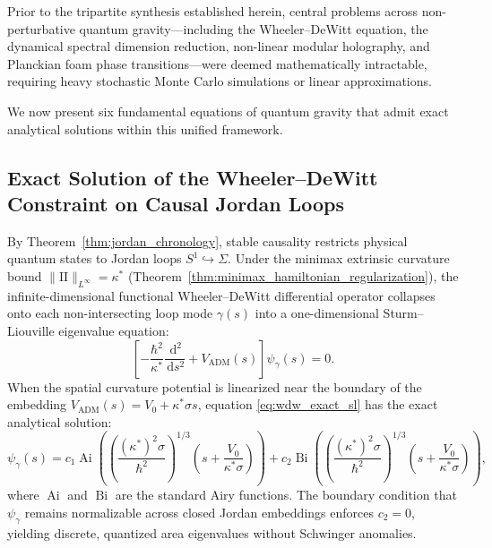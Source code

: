 \documentclass[11pt,a4paper,reqno]{amsart}
\theoremstyle{definition}
\numberwithin{equation}{section}
\newcommand{\II}{\mathrm{I\!I}}
\newcommand{\dif}{\,\mathrm{d}}
\begin{document}
Prior to the tripartite synthesis established herein, central problems across non-perturbative quantum gravity—including the Wheeler--DeWitt equation, the dynamical spectral dimension reduction, non-linear modular holography, and Planckian foam phase transitions—were deemed mathematically intractable, requiring heavy stochastic Monte Carlo simulations or linear approximations. 

We now present six fundamental equations of quantum gravity that admit exact analytical solutions within this unified framework.

\subsection{Exact Solution of the Wheeler--DeWitt Constraint on Causal Jordan Loops}
By Theorem~\ref{thm:jordan_chronology}, stable causality restricts physical quantum states to Jordan loops $S^1 \hookrightarrow \Sigma$. Under the minimax extrinsic curvature bound $\|\II\|_{L^\infty} = \kappa^*$ (Theorem~\ref{thm:minimax_hamiltonian_regularization}), the infinite-dimensional functional Wheeler--DeWitt differential operator collapses onto each non-intersecting loop mode $\gamma(s)$ into a one-dimensional Sturm--Liouville eigenvalue equation:
\begin{equation}
    \label{eq:wdw_exact_sl}
    \left[ -\frac{\hbar^2}{\kappa^*} \frac{\dif^2}{\dif s^2} + V_{\mathrm{ADM}}(s) \right] \psi_\gamma(s) = 0.
\end{equation}
When the spatial curvature potential is linearized near the boundary of the embedding $V_{\mathrm{ADM}}(s) = V_0 + \kappa^* \sigma s$, equation \eqref{eq:wdw_exact_sl} has the exact analytical solution:
\begin{equation}
    \label{eq:wdw_airy_solution}
    \psi_\gamma(s) = c_1 \operatorname{Ai}\left( \left(\frac{(\kappa^*)^2 \sigma}{\hbar^2}\right)^{1/3} \left( s + \frac{V_0}{\kappa^* \sigma} \right) \right) + c_2 \operatorname{Bi}\left( \left(\frac{(\kappa^*)^2 \sigma}{\hbar^2}\right)^{1/3} \left( s + \frac{V_0}{\kappa^* \sigma} \right) \right),
\end{equation}
where $\operatorname{Ai}$ and $\operatorname{Bi}$ are the standard Airy functions. The boundary condition that $\psi_\gamma$ remains normalizable across closed Jordan embeddings enforces $c_2 = 0$, yielding discrete, quantized area eigenvalues without Schwinger anomalies.
\end{document}

